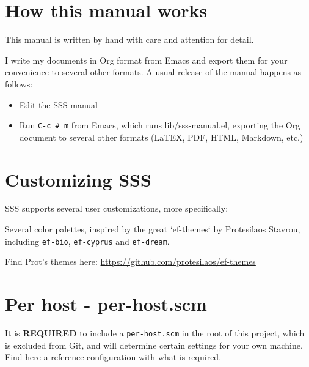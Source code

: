 \documentclass[11pt]{article}
\begin{document}
\section{How this manual works}
\label{sec:orgb0885d9}

This manual is written by hand with care and attention for detail.

I write my documents in Org format from Emacs and export them for your convenience to several other formats. A usual release of the manual happens as follows:

\begin{itemize}
\item Edit the SSS manual
\item Run \texttt{C-c \# m} from Emacs, which runs lib/sss-manual.el, exporting the Org document to several other formats (LaTEX, PDF, HTML, Markdown, etc.)
\end{itemize}

\section{Customizing SSS}
\label{sec:org760c210}

SSS supports several user customizations, more specifically:

Several color palettes, inspired by the great `ef-themes` by Protesilaos Stavrou, including \texttt{ef-bio}, \texttt{ef-cyprus} and \texttt{ef-dream}.

Find Prot's themes here: \url{https://github.com/protesilaos/ef-themes}


\section{Per host - per-host.scm}
\label{sec:org25a044f}

It is \textbf{REQUIRED} to include a \texttt{per-host.scm} in the root of this project, which is excluded from Git, and will determine certain settings for your own machine.
Find here a reference configuration with what is required.
\end{document}
